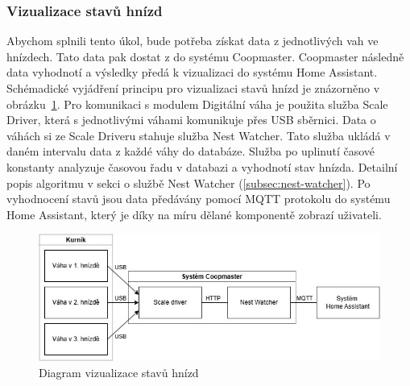 \subsubsection{Vizualizace stavů hnízd}
Abychom splnili tento úkol, bude potřeba získat data z jednotlivých vah ve hnízdech.
Tato data pak dostat z do systému Coopmaster.
Coopmaster následně data vyhodnotí a výsledky předá k vizualizaci do systému Home Assistant.
Schémadické vyjádření principu pro vizualizaci stavů hnízd je znázorněno v obrázku~\ref{fig:vizualizace_stavu_hnizd}. \newline
Pro komunikaci s modulem Digitální váha je použita služba Scale Driver, která s jednotlivými váhami komunikuje přes USB sběrnici.
Data o váhách si ze Scale Driveru stahuje služba Nest Watcher.
Tato služba ukládá v daném intervalu data z každé váhy do databáze.
Služba po uplinutí časové konstanty analyzuje časovou řadu v databazi a vyhodnotí stav hnízda.
Detailní popis algoritmu v sekci o službě Nest Watcher (\ref{subsec:nest-watcher}).
Po vyhodnocení stavů jsou data předávány pomocí MQTT protokolu do systému Home Assistant, který je díky na míru dělané komponentě zobrazí uživateli.
\begin{figure}[h]
    \centering
    \includegraphics[width=\textwidth]{img/vizualizace_stavu_hnizd}
    \caption{Diagram vizualizace stavů hnízd}
    \label{fig:vizualizace_stavu_hnizd}
\end{figure}

